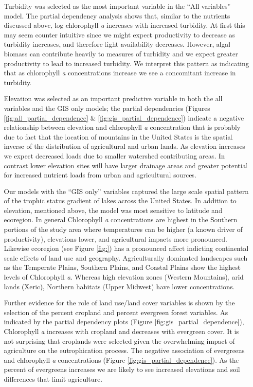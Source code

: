 \documentclass[11pt,]{article}
\begin{document}
Turbidity was selected as the most important variable in the ``All
variables'' model. The partial dependency analysis shows that, similar
to the nutrients discussed above, log chlorophyll \emph{a} increases
with increased turbidity. At first this may seem counter intuitive since
we might expect productivity to decrease as turbidity increases, and
therefore light availability decreases. However, algal biomass can
contribute heavily to measures of turbidity and we expect greater
productivity to lead to increased turbidity. We interpret this pattern
as indicating that as chlorophyll \emph{a} concentrations increase we
see a concomitant increase in turbidity.

Elevation was selected as an important predictive variable in both the
all variables and the GIS only models; the partial dependencies (Figures
\ref{fig:all_partial_dependence} \& \ref{fig:gis_partial_dependence})
indicate a negative relationship between elevation and chlorophyll
\emph{a} concentration that is probably due to fact that the location of
mountains in the United States is the spatial inverse of the
distribution of agricultural and urban lands. As elevation increases we
expect decreased loads due to smaller watershed contributing areas. In
contrast lower elevation sites will have larger drainage areas and
greater potential for increased nutrient loads from urban and
agricultural sources.

Our models with the ``GIS only'' variables captured the large scale
spatial pattern of the trophic status gradient of lakes across the
United States. In addition to elevation, mentioned above, the model was
most sensitive to latitude and ecoregion. In general Chlorophyll
\emph{a} concentrations are highest in the Southern portions of the
study area where temperatures can be higher (a known driver of
productivity), elevations lower, and agricultural impacts more
pronounced. Likewise ecoregion (see Figure \ref{fig:}) has a pronounced
affect indicting continental scale effects of land use and geography.
Agriculturally dominated landscapes such as the Temperate Plains,
Southern Plains, and Coastal Plains show the highest levels of
Chlorophyll \emph{a}. Whereas high elevation zones (Western Mountains),
arid lands (Xeric), Northern habitats (Upper Midwest) have lower
concentrations.

Further evidence for the role of land use/land cover variables is shown
by the selection of the percent cropland and percent evergreen forest
variables. As indicated by the partial dependency plots (Figure
\ref{fig:gis_partial_dependence}), Chlorophyll \emph{a} increases with
cropland and decreases with evergreen cover. It is not surprising that
croplands were selected given the overwhelming impact of agriculture on
the eutrophication process. The negative association of evergreens and
chlorophyll \emph{a} concentrations (Figure
\ref{fig:gis_partial_dependence}). As the percent of evergreens
increases we are likely to see increased elevations and soil differences
that limit agriculture.
\end{document}
